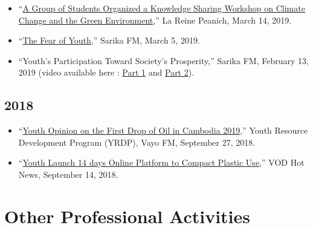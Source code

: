 \documentclass[10pt,a4paper]{article}
\begin{document}
\begin{adjustwidth}{.7cm}{}
\begin{itemize}[label={},itemindent=-2em,leftmargin=2em]
			\item “\href{https://www.lareine.com.kh/news/pr/38371/}{A Group of Students Organized a Knowledge Sharing Workshop on Climate Change and the Green Environment},” La Reine Peanich, March 14, 2019.
					
			\item “\href{https://www.facebook.com/SarikaFM/videos/577713829370931}{The Fear of Youth},” Sarika FM, March 5, 2019. 
						
			\item “Youth’s Participation Toward Society’s Prosperity,” Sarika FM, February 13, 2019 (video available here : \href{https://www.facebook.com/SarikaFM/videos/370794163739835}{Part 1} and \href{https://www.facebook.com/SarikaFM/videos/251588595754580}{Part 2}).
		\end{itemize}
	
	\subsection*{2018}
		\begin{itemize}[label={},itemindent=-2em,leftmargin=2em]

			\item “\href{https://www.facebook.com/yrdpcambodiapage/videos/2148807268711599}{Youth Opinion on the First Drop of Oil in Cambodia 2019},” Youth Resource Development Program (YRDP), Vayo FM, September 27, 2018. 
								
			\item “\href{https://vodkhmer.news/2018/09/14/youth-luanch-14-days-online-platform-to-compat-plastic-use/}{Youth Launch 14 days Online Platform to Compact Plastic Use},” VOD Hot News, September 14, 2018.		
			
		\end{itemize}
									
	\end{adjustwidth}		
	\vspace{-1em}
\section*{Other Professional Activities}
							
\end{document}
